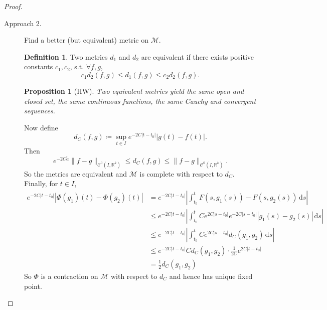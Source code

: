 \documentclass[12pt]{article}
\theoremstyle{plain}
\newtheorem*{prop}{Proposition}
\theoremstyle{definition}
\newtheorem*{defn}{Definition}
\begin{document}
\begin{proof}
\begin{description}
        \item[Approach 2.]
        Find a better (but equivalent) metric on $\mathcal{M}$.
        \begin{defn}
            Two metrics $d_1$ and $d_2$ are equivalent if there exists positive
            constants $c_1,c_2$, s.t. $\forall f,g$,
            $$c_1 d_2(f,g)\leq d_1(f,g)\leq c_2d_2(f,g).$$
        \end{defn}
        \begin{prop}[HW]
            Two equivalent metrics yield the same open and closed set, the same
            continuous functions, the same Cauchy and convergent sequences.
        \end{prop}
        Now define 
        $$d_{C}(f,g)\coloneqq \sup_{t\in I}e^{-2C|t-t_0|}|g(t)-f(t)|.$$
        Then
        $$e^{-2C\tilde{a}}\|f-g\|_{\mathcal{C}^0(I,\mathbb{R}^k)}\leq
        d_C(f,g)\leq
        \|f-g\|_{\mathcal{C}^0(I,\mathbb{R}^k)}.$$
        So the metrics are equivalent and
        $\mathcal{M}$ is complete with respect to $d_C$.
        Finally, for $t\in I$,
        $$\begin{aligned}
            e^{-2C|t-t_0|}\left|\Phi(g_1)(t)-\Phi(g_2)(t)\right|
            &=e^{-2C|t-t_0|}\left |\int_{t_0}^t
            F(s,g_1(s))-F(s,g_2(s))\,\mathrm{d}s\right|\\
            &\leq e^{-2C|t-t_0|}\left|
            \int_{t_0}^t
            Ce^{2C|s-t_0|}e^{-2C|s-t_0|}|g_1(s)-g_2(s)|\,\mathrm{d}s\right|\\
            &\leq e^{-2C|t-t_0|}\left| \int_{t_0}^t
            Ce^{2C|s-t_0|}d_C(g_1,g_2)\,\mathrm{d}s\right|\\
            &\leq e^{-2C|t-t_0|} C d_C(g_1,g_2)\cdot\frac{1}{2C}e^{2C|t-t_0|}\\
            &=\frac{1}{2}d_C(g_1,g_2)
        \end{aligned}$$
        So $\Phi$ is a contraction on $\mathcal{M}$ with respect to $d_C$ and
        hence has unique fixed point.
    \end{description}
\end{proof}
\end{document}
